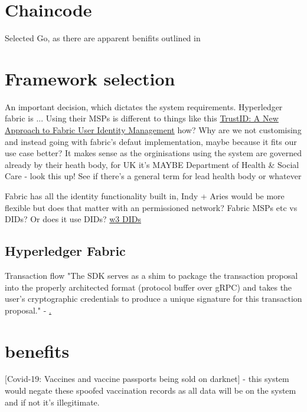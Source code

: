 \documentclass{report}
\begin{document}
\begin{flushleft}
\chapter{Chaincode}
Selected Go, as there are apparent benifits outlined in \cite{foschini_hyperledger_2020}

\chapter{Framework selection}
An important decision, which dictates the system requirements. Hyperledger fabric is ... Using their MSPs is different to things like this \href{'https://www.hyperledger.org/blog/2020/04/21/trustid-a-new-approach-to-fabric-user-identity-management'}{TrustID: A New Approach to Fabric User Identity Management} how? Why are we not customising and instead going with fabric's defaut implementation, maybe because it fits our use case better? It makes sense as the orginisations using the system are governed already by their heath body, for UK it's MAYBE Department of Health \& Social Care - look this up! See if there's a general term for lead health body or whatever

Fabric has all the identity functionality built in, Indy + Aries would be more flexible but does that matter with an permissioned network? Fabric MSPs etc vs DIDs? Or does it use DIDs? \href{'https://www.w3.org/TR/did-core/'}{w3 DIDs}

\section{Hyperledger Fabric}
Transaction flow "The SDK serves as a shim to package the transaction proposal into the properly architected format (protocol buffer over gRPC) and takes the user’s cryptographic credentials to produce a unique signature for this transaction proposal." - \href{"https://hyperledger-fabric.readthedocs.io/en/latest/txflow.html'}.\linebreak[1]



\chapter{benefits}
[Covid-19: Vaccines and vaccine passports being sold on darknet] - this system would negate these spoofed vaccination records as all data will be on the system and if not it's illegitimate.
\linebreak[3]


\end{flushleft}
\end{document}
